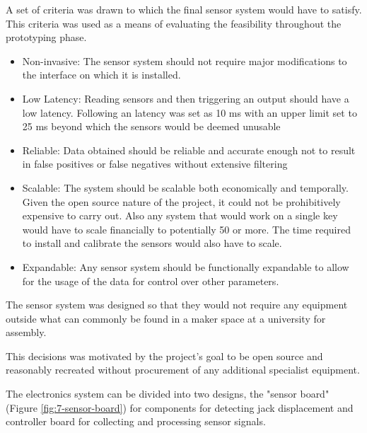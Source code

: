 A set of criteria was drawn to which the final sensor system would have
to satisfy. This criteria was used as a means of evaluating the
feasibility throughout the prototyping phase.

\begin{itemize}
\item
  Non-invasive: The sensor system should not require major modifications
  to the interface on which it is installed.
\item
  Low Latency: Reading sensors and then triggering an output should have
  a low latency. Following \cite{Jack2016} an latency was set as 10 ms
  with an upper limit set to 25 ms beyond which the sensors would be
  deemed unusable
\item
  Reliable: Data obtained should be reliable and accurate enough not to
  result in false positives or false negatives without extensive
  filtering
\item
  Scalable: The system should be scalable both economically and
  temporally. Given the open source nature of the project, it could not
  be prohibitively expensive to carry out. Also any system that would
  work on a single key would have to scale financially to potentially 50
  or more. The time required to install and calibrate the sensors would
  also have to scale.
\item
  Expandable: Any sensor system should be functionally expandable to
  allow for the usage of the data for control over other parameters.
\end{itemize}



The sensor system was designed so that they would not require any equipment outside what can commonly be found in a maker space at a university for assembly.



This decisions was motivated by the project's goal to be open source and reasonably recreated without procurement of any additional specialist equipment.


The electronics system can be divided into two designs, the "sensor board" (Figure \ref{fig:7-sensor-board}) for components for detecting jack displacement and controller board for collecting and processing sensor signals.

